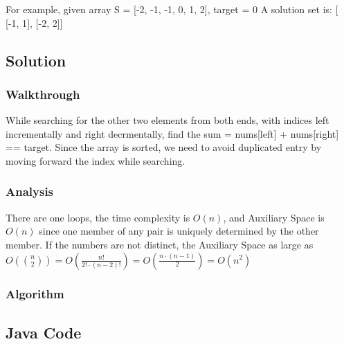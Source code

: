 \documentclass[]{book}
\begin{document}
For example, given array S = {[}-2, -1, -1, 0, 1, 2{]}, target = 0
A solution set is:
{[}
{[}-1, 1{]},
{[}-2, 2{]}{]}

\hypertarget{solution-3}{%
\subsection{Solution}\label{solution-3}}

\hypertarget{walkthrough-5}{%
\subsubsection{Walkthrough}\label{walkthrough-5}}

While searching for the other two elements from both ends, with indices left incrementally and right decrmentally, find
the sum = nums{[}left{]} + nums{[}right{]} == target. Since the array is
sorted, we need to avoid duplicated entry by moving forward the index while searching.

\hypertarget{analysis-5}{%
\subsubsection{Analysis}\label{analysis-5}}

There are one loops, the time complexity is \(O(n)\), and Auxiliary Space is \(O(n)\) since one member of any pair is
uniquely determined by the other member. If the numbers are not distinct, the Auxiliary Space as large as
\(O(\binom{n}{2}) = O(\frac{n!}{2!\cdot (n-2)!}) = O(\frac{n\cdot (n-1)}{2}) = O(n^2)\)

\hypertarget{algorithm-5}{%
\subsubsection{Algorithm}\label{algorithm-5}}

\hypertarget{java-code-3}{%
\subsection{Java Code}\label{java-code-3}}
\end{document}
